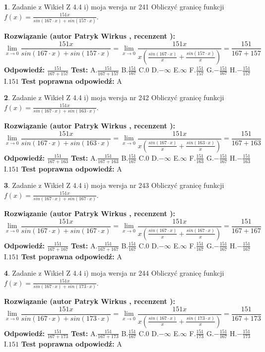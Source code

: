 \documentclass[12pt, a4paper]{article}
\theoremstyle{definition} %
\newtheorem{zad}{}
\newcommand{\zadStart}[1]{\begin{zad}#1\newline}
\newcommand{\zadStop}{\end{zad}}
\newcommand{\rozwStart}[2]{\noindent \textbf{Rozwiązanie (autor #1 , recenzent #2): }\newline}
\newcommand{\rozwStop}{\newline}
\newcommand{\odpStart}{\noindent \textbf{Odpowiedź:}\newline}
\newcommand{\odpStop}{\newline}
\newcommand{\testStart}{\noindent \textbf{Test:}\newline}
\newcommand{\testStop}{\newline}
\newcommand{\kluczStart}{\noindent \textbf{Test poprawna odpowiedź:}\newline}
\newcommand{\kluczStop}{\newline}
\begin{document}
\zadStart{Zadanie z Wikieł Z 4.4 i) moja wersja nr 241}
Obliczyć granicę funkcji $f(x)=\frac{151x}{sin(167\cdot x) +sin(157\cdot x)}$.
\zadStop
\rozwStart{Patryk Wirkus}{}
$$\lim\limits_{x\to 0}\frac{151x}{sin(167\cdot x) +sin(157\cdot x)}=\lim\limits_{x\to 0}\frac{151x}{x(\frac{sin(167\cdot x)}{x}+\frac{sin(157\cdot x)}{x})}=\frac{151}{167+157}$$
\rozwStop
\odpStart
$\frac{151}{167+157}$
\odpStop
\testStart
A.$\frac{151}{167+157}$
B.$\frac{151}{167}$
C.$0$
D.$-\infty$
E.$\infty$
F.$\frac{151}{157}$
G.$-\frac{151}{167}$
H.$-\frac{151}{157}$
I.$151$
\testStop
\kluczStart
A
\kluczStop



\zadStart{Zadanie z Wikieł Z 4.4 i) moja wersja nr 242}
Obliczyć granicę funkcji $f(x)=\frac{151x}{sin(167\cdot x) +sin(163\cdot x)}$.
\zadStop
\rozwStart{Patryk Wirkus}{}
$$\lim\limits_{x\to 0}\frac{151x}{sin(167\cdot x) +sin(163\cdot x)}=\lim\limits_{x\to 0}\frac{151x}{x(\frac{sin(167\cdot x)}{x}+\frac{sin(163\cdot x)}{x})}=\frac{151}{167+163}$$
\rozwStop
\odpStart
$\frac{151}{167+163}$
\odpStop
\testStart
A.$\frac{151}{167+163}$
B.$\frac{151}{167}$
C.$0$
D.$-\infty$
E.$\infty$
F.$\frac{151}{163}$
G.$-\frac{151}{167}$
H.$-\frac{151}{163}$
I.$151$
\testStop
\kluczStart
A
\kluczStop



\zadStart{Zadanie z Wikieł Z 4.4 i) moja wersja nr 243}
Obliczyć granicę funkcji $f(x)=\frac{151x}{sin(167\cdot x) +sin(167\cdot x)}$.
\zadStop
\rozwStart{Patryk Wirkus}{}
$$\lim\limits_{x\to 0}\frac{151x}{sin(167\cdot x) +sin(167\cdot x)}=\lim\limits_{x\to 0}\frac{151x}{x(\frac{sin(167\cdot x)}{x}+\frac{sin(167\cdot x)}{x})}=\frac{151}{167+167}$$
\rozwStop
\odpStart
$\frac{151}{167+167}$
\odpStop
\testStart
A.$\frac{151}{167+167}$
B.$\frac{151}{167}$
C.$0$
D.$-\infty$
E.$\infty$
F.$\frac{151}{167}$
G.$-\frac{151}{167}$
H.$-\frac{151}{167}$
I.$151$
\testStop
\kluczStart
A
\kluczStop



\zadStart{Zadanie z Wikieł Z 4.4 i) moja wersja nr 244}
Obliczyć granicę funkcji $f(x)=\frac{151x}{sin(167\cdot x) +sin(173\cdot x)}$.
\zadStop
\rozwStart{Patryk Wirkus}{}
$$\lim\limits_{x\to 0}\frac{151x}{sin(167\cdot x) +sin(173\cdot x)}=\lim\limits_{x\to 0}\frac{151x}{x(\frac{sin(167\cdot x)}{x}+\frac{sin(173\cdot x)}{x})}=\frac{151}{167+173}$$
\rozwStop
\odpStart
$\frac{151}{167+173}$
\odpStop
\testStart
A.$\frac{151}{167+173}$
B.$\frac{151}{167}$
C.$0$
D.$-\infty$
E.$\infty$
F.$\frac{151}{173}$
G.$-\frac{151}{167}$
H.$-\frac{151}{173}$
I.$151$
\testStop
\kluczStart
A
\kluczStop
\end{document}
